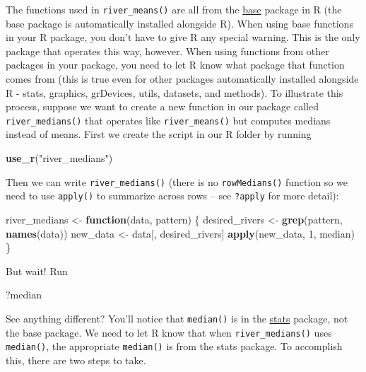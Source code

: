 \documentclass[
]{book}
\newenvironment{Shaded}{\begin{snugshade}}{\end{snugshade}}
\newcommand{\ControlFlowTok}[1]{\textcolor[rgb]{0.13,0.29,0.53}{\textbf{#1}}}
\newcommand{\DecValTok}[1]{\textcolor[rgb]{0.00,0.00,0.81}{#1}}
\newcommand{\KeywordTok}[1]{\textcolor[rgb]{0.13,0.29,0.53}{\textbf{#1}}}
\newcommand{\NormalTok}[1]{#1}
\newcommand{\StringTok}[1]{\textcolor[rgb]{0.31,0.60,0.02}{#1}}
\begin{document}
The functions used in \texttt{river\_means()} are all from the \href{https://stat.ethz.ch/R-manual/R-devel/library/base/html/00Index.html}{base} package in R (the base package is automatically installed alongside R). When using base functions in your R package, you don't have to give R any special warning. This is the only package that operates this way, however. When using functions from other packages in your package, you need to let R know what package that function comes from (this is true even for other packages automatically installed alongside R - stats, graphics, grDevices, utils, datasets, and methods). To illustrate this process, suppose we want to create a new function in our package called \texttt{river\_medians()} that operates like \texttt{river\_means()} but computes medians instead of means. First we create the script in our R folder by running

\begin{Shaded}
\begin{Highlighting}[]
\KeywordTok{use_r}\NormalTok{(}\StringTok{"river_medians"}\NormalTok{)}
\end{Highlighting}
\end{Shaded}

Then we can write \texttt{river\_medians()} (there is no \texttt{rowMedians()} function so we need to use \texttt{apply()} to summarize across rows -- see \texttt{?apply} for more detail):

\begin{Shaded}
\begin{Highlighting}[]
\NormalTok{river_medians <-}\StringTok{ }\ControlFlowTok{function}\NormalTok{(data, pattern) \{}
\NormalTok{  desired_rivers <-}\StringTok{ }\KeywordTok{grep}\NormalTok{(pattern, }\KeywordTok{names}\NormalTok{(data))}
\NormalTok{  new_data <-}\StringTok{ }\NormalTok{data[, desired_rivers]}
  \KeywordTok{apply}\NormalTok{(new_data, }\DecValTok{1}\NormalTok{, median)}
\NormalTok{\}}
\end{Highlighting}
\end{Shaded}

But wait! Run

\begin{Shaded}
\begin{Highlighting}[]
\NormalTok{?median}
\end{Highlighting}
\end{Shaded}

See anything different? You'll notice that \texttt{median()} is in the \href{https://stat.ethz.ch/R-manual/R-devel/library/stats/html/00Index.html}{stats} package, not the base package. We need to let R know that when \texttt{river\_medians()} uses \texttt{median()}, the appropriate \texttt{median()} is from the stats package. To accomplish this, there are two steps to take.
\end{document}
